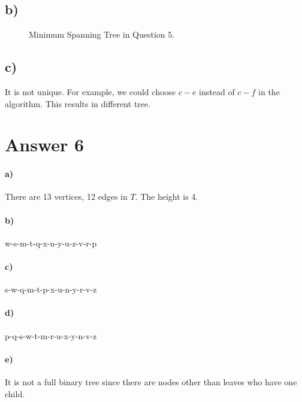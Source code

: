 \documentclass[12pt]{article}
\begin{document}
\subsection*{b)}
\begin{figure}[H]
	\centering
	\caption{Minimum Spanning Tree in Question 5.}	
	\label{fig:t5}
\end{figure}

\subsection*{c)} 
It is not unique. For example, we could choose $c-e$ instead of $c-f$ in the algorithm. This results in different tree.
  
\section*{Answer 6}
\paragraph*{a)} There are 13 vertices, 12 edges in $T$. The height is 4.

\paragraph*{b)} w-s-m-t-q-x-n-y-u-z-v-r-p

\paragraph*{c)} s-w-q-m-t-p-x-u-n-y-r-v-z

\paragraph*{d)} p-q-s-w-t-m-r-u-x-y-n-v-z

\paragraph*{e)} It is not a full binary tree since there are nodes other than leaves who have one child. 
\end{document}
